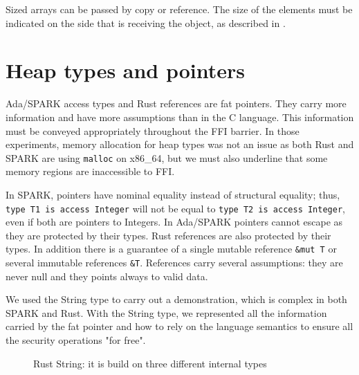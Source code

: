 \documentclass[nomenclature, english, bibtex]{kththesis}
\newcommand{\inlinecode}[1]{\texttt{#1}}
\begin{document}
Sized arrays can be passed by copy or reference. The size of the elements must be indicated on the side that is receiving the object, as described in .

\section{Heap types and pointers}

Ada/SPARK access types and Rust references are fat pointers. They carry more information and have more assumptions than in the C language. This information must be conveyed appropriately throughout the FFI barrier. In those experiments, memory allocation for heap types was not an issue as both Rust\cite{santos_investigating_2022} and SPARK are using \texttt{malloc} on x86\_64, but we must also underline that some memory regions are inaccessible to \gls{FFI}.


In SPARK, pointers have nominal equality instead of structural equality; thus, \inlinecode{type T1 is access Integer} will not be equal to \inlinecode{type T2 is access Integer}, even if both are pointers to Integers. In Ada/SPARK pointers cannot escape as they are protected by their types. Rust references are also protected by their types. In addition there is a guarantee of a single mutable reference \texttt{\&mut T} or several immutable references \texttt{\&T}. References carry several assumptions: \first they are never null and \Second they points always to valid data.

We used the String type to carry out a demonstration, which is complex in both SPARK and Rust. With the String type, we represented all the information carried by the fat pointer and how to rely on the language semantics to ensure all the security operations "for free".



\begin{figure}[ht!]
    \centering
  \caption{Rust String: it is build on three different internal types}
  \label{fig:ruststring}
\end{figure}
\end{document}
